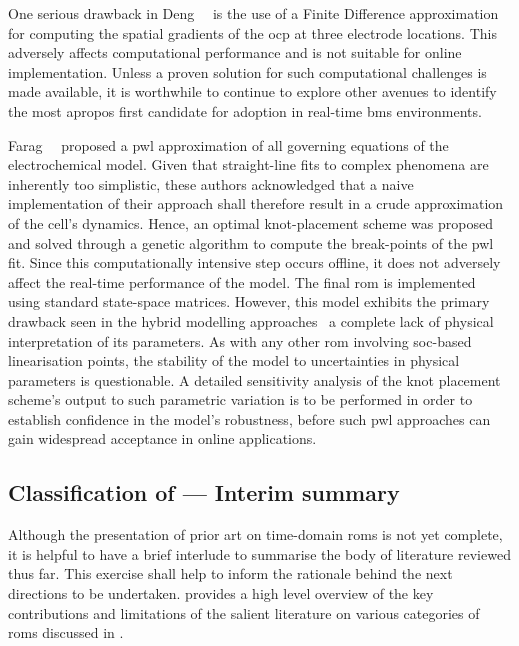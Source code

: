 One  serious drawback  in Deng~\etal{}~\cite{Deng2018}  is the  use of  a Finite
Difference approximation for computing the spatial gradients of the \gls{ocp} at
three electrode locations. This  adversely affects computational performance and
is not  suitable for online  implementation. Unless  a proven solution  for such
computational  challenges is  made available,  it is  worthwhile to  continue to
explore other avenues to identify the  most apropos first candidate for adoption
in real-time \gls{bms} environments.

Farag~\etal{}~\cite{Farag2017}  proposed   a  \gls{pwl}  approximation   of  all
governing equations of the electrochemical  model. Given that straight-line fits
to complex phenomena  are inherently too simplistic,  these authors acknowledged
that a naive implementation of their  approach shall therefore result in a crude
approximation of  the cell's dynamics.  Hence, an optimal  knot-placement scheme
was proposed and solved through a  genetic algorithm to compute the break-points
of the \gls{pwl} fit. Since  this computationally intensive step occurs offline,
it does not  adversely affect the real-time performance of  the model. The final
\gls{rom}  is implemented  using  standard state-space  matrices. However,  this
model  exhibits  the primary  drawback seen in the hybrid  modelling approaches
\ie~a complete lack of physical  interpretation of its parameters. As with any
other \gls{rom} involving \gls{soc}-based linearisation points, the stability of
the model  to uncertainties in  physical parameters is questionable.  A detailed
sensitivity analysis  of the knot  placement scheme's output to  such parametric
variation is  to be performed  in order to  establish confidence in  the model's
robustness, before such  \gls{pwl} approaches can gain  widespread acceptance in
online applications.

\subsection{Classification of  --- Interim summary}

Although the  presentation of prior art on time-domain \glspl{rom} is not yet
complete, it is helpful to have a brief interlude to summarise the body of
literature reviewed thus far. This exercise shall help to inform the rationale
behind the next directions to be undertaken.
 provides a high level overview of the
key contributions and limitations of the salient literature on various
categories of \glspl{rom} discussed in
.

